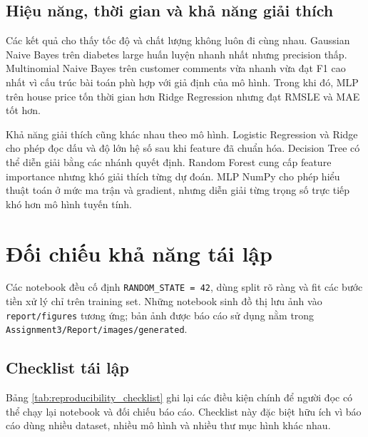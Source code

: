 \documentclass[12pt,a4paper]{report}
\newcommand{\modelpath}[1]{\texttt{#1}}
\begin{document}
\subsection{Hiệu năng, thời gian và khả năng giải thích}
Các kết quả cho thấy tốc độ và chất lượng không luôn đi cùng nhau.
Gaussian Naive Bayes trên diabetes large huấn luyện nhanh nhất nhưng precision thấp.
Multinomial Naive Bayes trên customer comments vừa nhanh vừa đạt F1 cao nhất vì cấu trúc bài toán phù hợp với giả định của mô hình.
Trong khi đó, MLP trên house price tốn thời gian hơn Ridge Regression nhưng đạt RMSLE và MAE tốt hơn.

Khả năng giải thích cũng khác nhau theo mô hình.
Logistic Regression và Ridge cho phép đọc dấu và độ lớn hệ số sau khi feature đã chuẩn hóa.
Decision Tree có thể diễn giải bằng các nhánh quyết định.
Random Forest cung cấp feature importance nhưng khó giải thích từng dự đoán.
MLP NumPy cho phép hiểu thuật toán ở mức ma trận và gradient, nhưng diễn giải từng trọng số trực tiếp khó hơn mô hình tuyến tính.

\section{Đối chiếu khả năng tái lập}
Các notebook đều cố định \texttt{RANDOM\_STATE = 42}, dùng split rõ ràng và fit các bước tiền xử lý chỉ trên training set. Những notebook sinh đồ thị lưu ảnh vào \modelpath{report/figures} tương ứng; bản ảnh được báo cáo sử dụng nằm trong \modelpath{Assignment3/Report/images/generated}.

\subsection{Checklist tái lập}
Bảng \ref{tab:reproducibility_checklist} ghi lại các điều kiện chính để người đọc có thể chạy lại notebook và đối chiếu báo cáo.
Checklist này đặc biệt hữu ích vì báo cáo dùng nhiều dataset, nhiều mô hình và nhiều thư mục hình khác nhau.
\end{document}
